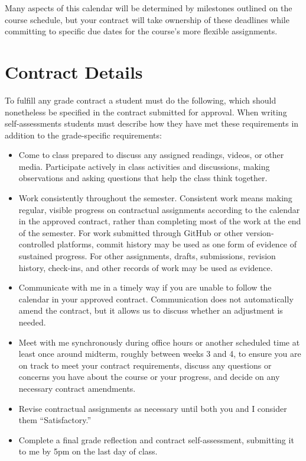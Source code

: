 \documentclass[
]{book}
\newcounter{none} %
\begin{document}
Many aspects of this calendar will be determined by milestones outlined on the course schedule, but your contract will take ownership of these deadlines while committing to specific due dates for the course's more flexible assignments.

\section*{Contract Details}\label{contract-details}


To fulfill any grade contract a student must do the following, which should nonetheless be specified in the contract submitted for approval. When writing self-assessments students must describe how they have met these requirements in addition to the grade-specific requirements:

\begin{itemize}
\item
  Come to class prepared to discuss any assigned readings, videos, or other media. Participate actively in class activities and discussions, making observations and asking questions that help the class think together.
\item
  Work consistently throughout the semester. Consistent work means making regular, visible progress on contractual assignments according to the calendar in the approved contract, rather than completing most of the work at the end of the semester. For work submitted through GitHub or other version-controlled platforms, commit history may be used as one form of evidence of sustained progress. For other assignments, drafts, submissions, revision history, check-ins, and other records of work may be used as evidence.
\item
  Communicate with me in a timely way if you are unable to follow the calendar in your approved contract. Communication does not automatically amend the contract, but it allows us to discuss whether an adjustment is needed.
\item
  Meet with me synchronously during office hours or another scheduled time at least once around midterm, roughly between weeks 3 and 4, to ensure you are on track to meet your contract requirements, discuss any questions or concerns you have about the course or your progress, and decide on any necessary contract amendments.
\item
  Revise contractual assignments as necessary until both you and I consider them ``Satisfactory.''
\item
  Complete a final grade reflection and contract self-assessment, submitting it to me by 5pm on the last day of class.
\end{itemize}
\end{document}
